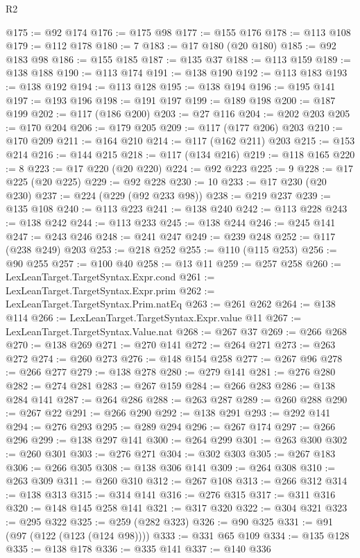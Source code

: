 \begin{lexlean}{R2}
\begin{coremodule}
@175 := @92 @174
@176 := @175 @98
@177 := @155 @176
@178 := @113 @108
@179 := @112 @178
@180 := 7
@183 := @17 @180 (@20 @180)
@185 := @92 @183 @98
@186 := @155 @185
@187 := @135 @37
@188 := @113 @159
@189 := @138 @188
@190 := @113 @174
@191 := @138 @190
@192 := @113 @183
@193 := @138 @192
@194 := @113 @128
@195 := @138 @194
@196 := @195 @141
@197 := @193 @196
@198 := @191 @197
@199 := @189 @198
@200 := @187 @199
@202 := @117 (@186 @200)
@203 := @27 @116
@204 := @202 @203
@205 := @170 @204
@206 := @179 @205
@209 := @117 (@177 @206) @203
@210 := @170 @209
@211 := @164 @210
@214 := @117 (@162 @211) @203
@215 := @153 @214
@216 := @144 @215
@218 := @117 (@134 @216)
@219 := @118 @165
@220 := 8
@223 := @17 @220 (@20 @220)
@224 := @92 @223
@225 := 9
@228 := @17 @225 (@20 @225)
@229 := @92 @228
@230 := 10
@233 := @17 @230 (@20 @230)
@237 := @224 (@229 (@92 @233 @98))
@238 := @219 @237
@239 := @135 @108
@240 := @113 @223
@241 := @138 @240
@242 := @113 @228
@243 := @138 @242
@244 := @113 @233
@245 := @138 @244
@246 := @245 @141
@247 := @243 @246
@248 := @241 @247
@249 := @239 @248
@252 := @117 (@238 @249) @203
@253 := @218 @252
@255 := @110 (@115 @253)
@256 := @90 @255
@257 := @100 @40
@258 := @13 @11
@259 := @257 @258
@260 := LexLeanTarget.TargetSyntax.Expr.cond
@261 := LexLeanTarget.TargetSyntax.Expr.prim
@262 := LexLeanTarget.TargetSyntax.Prim.natEq
@263 := @261 @262
@264 := @138 @114
@266 := LexLeanTarget.TargetSyntax.Expr.value @11
@267 := LexLeanTarget.TargetSyntax.Value.nat
@268 := @267 @37
@269 := @266 @268
@270 := @138 @269
@271 := @270 @141
@272 := @264 @271
@273 := @263 @272
@274 := @260 @273
@276 := @148 @154 @258
@277 := @267 @96
@278 := @266 @277
@279 := @138 @278
@280 := @279 @141
@281 := @276 @280
@282 := @274 @281
@283 := @267 @159
@284 := @266 @283
@286 := @138 @284 @141
@287 := @264 @286
@288 := @263 @287
@289 := @260 @288
@290 := @267 @22
@291 := @266 @290
@292 := @138 @291
@293 := @292 @141
@294 := @276 @293
@295 := @289 @294
@296 := @267 @174
@297 := @266 @296
@299 := @138 @297 @141
@300 := @264 @299
@301 := @263 @300
@302 := @260 @301
@303 := @276 @271
@304 := @302 @303
@305 := @267 @183
@306 := @266 @305
@308 := @138 @306 @141
@309 := @264 @308
@310 := @263 @309
@311 := @260 @310
@312 := @267 @108
@313 := @266 @312
@314 := @138 @313
@315 := @314 @141
@316 := @276 @315
@317 := @311 @316
@320 := @148 @145 @258 @141
@321 := @317 @320
@322 := @304 @321
@323 := @295 @322
@325 := @259 (@282 @323)
@326 := @90 @325
@331 := @91 (@97 (@122 (@123 (@124 @98))))
@333 := @331 @65 @109
@334 := @135 @128
@335 := @138 @178
@336 := @335 @141
@337 := @140 @336

\end{coremodule}
\end{lexlean}

